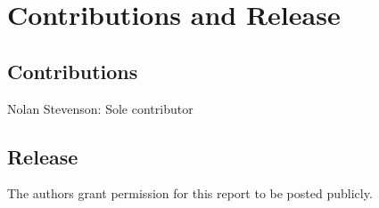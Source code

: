\section{Contributions and Release}

\subsection{Contributions}
 Nolan Stevenson: Sole contributor

\subsection{Release}
The authors grant permission for this report to be posted publicly.